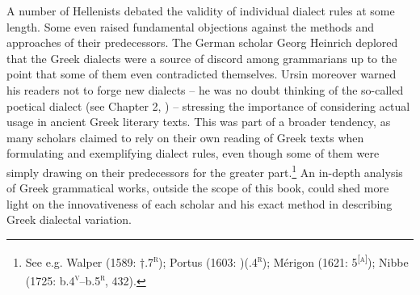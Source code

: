 \documentclass[output=paper]{langsci/langscibook}
\begin{document}
A number of Hellenists debated the validity of individual dialect rules at some length. Some even raised fundamental objections against the methods and approaches of their predecessors. The German scholar Georg Heinrich \citet[512]{Ursin1691} deplored that the Greek dialects were a source of discord among grammarians up to the point that some of them even contradicted themselves. Ursin moreover warned his readers not to forge new dialects – he was no doubt thinking of the so-called poetical dialect (see Chapter 2, ) – stressing the importance of considering actual usage in ancient Greek literary texts. This was part of a broader tendency, as many scholars claimed to rely on their own reading of Greek texts when formulating and exemplifying dialect rules, even though some of them were simply drawing on their predecessors for the greater part.\footnote{ \textrm{See e.g. Walper (1589: †.7}\textrm{\textsc{\textsuperscript{r}}}\textrm{); Portus (1603: )(.4}\textrm{\textsc{\textsuperscript{r}}}\textrm{); Mérigon (1621: 5}\textrm{\textsc{\textsuperscript{[a]}}}\textrm{); Nibbe (1725: b.4}\textrm{\textsc{\textsuperscript{v}}}\textrm{–b.5}\textrm{\textsc{\textsuperscript{r}}}\textrm{, 432).}} An in-depth analysis of Greek grammatical works, outside the scope of this book, could shed more light on the innovativeness of each scholar and his exact method in describing Greek dialectal variation.
\end{document}
